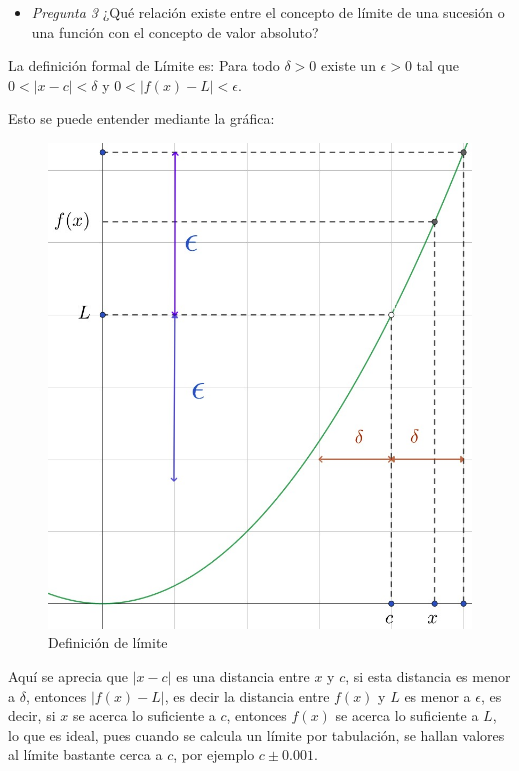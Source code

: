 \begin{itemize}
    \item \textit{Pregunta 3} ¿Qué relación existe entre el concepto de límite de una sucesión o una función con el concepto de valor absoluto?
\end{itemize}

La definición formal de Límite es: Para todo $\delta > 0$ existe un $\epsilon > 0$ tal que $0<|x-c|<\delta$ y $0<|f(x)-L|<\epsilon$.

Esto se puede entender mediante la gráfica:

\begin{figure}[H]
    \centering
    \includegraphics[scale=0.3]{images/geogebra/def_limite.jpeg}
    \caption{Definición de límite}
    \label{fig:def_limite}
\end{figure}

Aquí se aprecia que $|x-c|$ es una distancia entre $x$ y $c$, si esta distancia es menor a $\delta$, entonces $|f(x)-L|$, es decir la distancia entre $f(x)$ y $L$ es menor a $\epsilon$, es decir, si $x$ se acerca lo suficiente a $c$, entonces $f(x)$ se acerca lo suficiente a $L$, lo que es ideal, pues cuando se calcula un límite por tabulación, se hallan valores al límite bastante cerca a $c$, por ejemplo $c \pm 0.001$.

